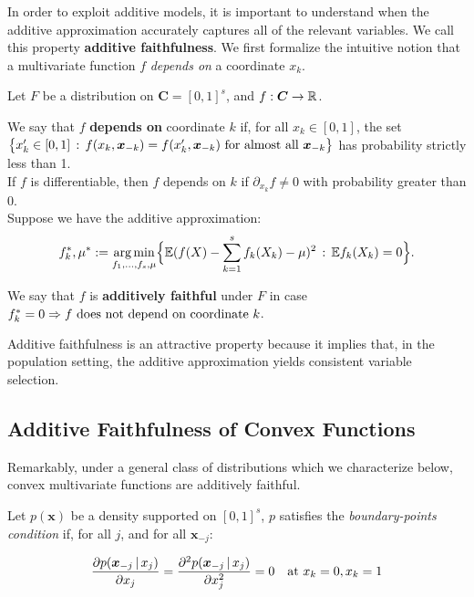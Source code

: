 In order to exploit additive models, it is important to understand when the
additive approximation accurately captures all of the relevant variables.
We call this property \textbf{additive faithfulness}. We first formalize the intuitive notion that a multivariate function $f$ \emph{depends on} a coordinate $x_k$.

\begin{definition}
  Let $F$ be a distribution on $\mathbf{C}=[0,1]^s$, and $f:\mbox{\boldmath $C$}\rightarrow {\mathbb R}$. 
  
We say that $f$ \textbf{depends on} coordinate $k$ if, for all $x_k \in [0,1]$, the set 
$\big\{ x'_k \in [0, 1] \,:\, f(x_k, \mbox{\boldmath $x$}_{-k}) = f(x'_k, \mbox{\boldmath $x$}_{-k}) 
\textrm{ for almost all  $\mbox{\boldmath $x$}_{-k}$} \big\}$ 
has probability strictly less than 1.\\

If $f$ is differentiable, then $f$ depends on $k$ if $\partial_{x_k} f \neq 0$ with probability greater than 0.\\

Suppose we have the additive approximation:
\begin{equation}
\label{eqn:unconstrained_additive}
f_k^*, \mu^* := \mathop{\text{\rm arg\,min}}_{f_1,\ldots, f_s, \mu} \Bigl\{ 
             {\mathbb E} ( f(X) - \sum_{k=1}^s f_k(X_k) -\mu )^2 
         \,:\, {\mathbb E} f_k(X_k) = 0 \Bigr\}.
\end{equation}

We say that $f$ is \textbf{additively faithful} under $F$ in case $f^*_k = 0 \Rightarrow \textrm{$f$ does not depend on coordinate $k$}$. 

\end{definition}

Additive faithfulness is an attractive property because it implies that, in the population setting, the additive approximation yields consistent variable selection. 

\subsection{Additive Faithfulness of Convex Functions}

Remarkably, under a general class of distributions which we characterize below, convex multivariate functions are additively faithful.

\begin{definition}
\label{defn:boundary-point}
Let $p(\mathbf{x})$ be a density supported on $[0,1]^s$, $p$ satisfies the \emph{boundary-points condition} if, for all $j$, and for all $\mathbf{x}_{-j}$:

\[
\frac{\partial p(\mbox{\boldmath $x$}_{-j} {\,|\,} x_j)}{\partial x_j}  =  
\frac{\partial^2 p(\mbox{\boldmath $x$}_{-j} {\,|\,} x_j)}{\partial x_j^2} = 0
\quad \textrm{at } x_k = 0, x_k = 1
\]

\end{definition}



